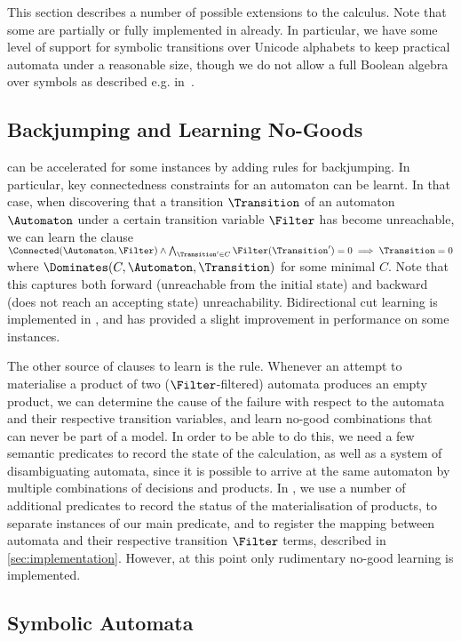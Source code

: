 
This section describes a number of possible extensions to the calculus. Note
that some are partially or fully implemented in \Catra{} already. In particular,
we have some level of support for symbolic transitions over Unicode alphabets to
keep practical automata under a reasonable size, though we do not allow a full Boolean algebra over symbols as described e.g. in~\cite{symbolic-automata}.

\subsection{Backjumping and Learning No-Goods}\label{sec:ext:backjumping}

\Calculus{} can be accelerated for some instances by adding rules for
backjumping. In particular, key connectedness constraints for an automaton can
be learnt. In that case, when discovering that a transition $\Transition$ of an
automaton $\Automaton$ under a certain transition variable $\Filter$ has become
unreachable, we can learn the clause $\Connected(\Automaton, \Filter) \land
\bigwedge_{\Transition' \in C} \Filter(\Transition') = 0 \implies \Transition = 0$ where
$\Dominates(C, \Automaton, \Transition)$ for some minimal $C$. Note that this
captures both forward (unreachable from the initial state) and
backward (does not reach an accepting state) unreachability. Bidirectional cut
learning is implemented in \Catra, and has provided a slight improvement in
performance on some instances.

The other source of clauses to learn is the \Materialise{} rule. Whenever an
attempt to materialise a product of two ($\Filter$-filtered) automata
produces an empty product, we can determine
the cause of the failure with respect to the automata and their respective
transition variables, and learn no-good combinations that can never be part of a
model. In order to be able to do this, we need a few semantic predicates to
record the state of the calculation, as well as a system of disambiguating
automata, since it is possible to arrive at the same automaton by multiple
combinations of decisions and products. In \Catra{}, we use a number of
additional predicates to record the status of the materialisation of products,
to separate instances of our main predicate, and to register the mapping between
automata and their respective transition $\Filter$ terms, described in
\cref{sec:implementation}. However, at this point only rudimentary no-good
learning is implemented.

\subsection{Symbolic Automata}\label{sec:ext:symbolic}

